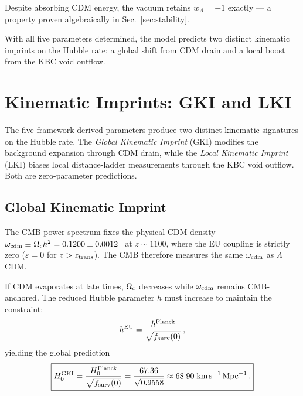 \documentclass[a4paper,fleqn]{cas-dc}
\newcommand{\eps}{\varepsilon}
\newcommand{\ztrans}{z_{\rm trans}}
\newcommand{\fsurv}{f_{\rm surv}}
\newcommand{\Ocdm}{\Omega_{\rm c}}
\begin{document}
Despite absorbing CDM energy, the vacuum retains $w_\Lambda = -1$
exactly --- a property proven algebraically in
Sec.~\ref{sec:stability}.

With all five parameters determined, the model predicts two distinct
kinematic imprints on the Hubble rate: a global shift from CDM drain
and a local boost from the KBC void outflow.

\section{Kinematic Imprints: GKI and LKI}
\label{sec:gki_lki}

The five framework-derived parameters produce two distinct kinematic
signatures on the Hubble rate. The \textit{Global Kinematic Imprint}
(GKI) modifies the background expansion through CDM drain, while the
\textit{Local Kinematic Imprint} (LKI) biases local distance-ladder
measurements through the KBC void outflow. Both are zero-parameter
predictions.

\subsection{Global Kinematic Imprint}
\label{sec:gki}

The CMB power spectrum fixes the physical CDM density
$\omega_{\rm cdm} \equiv \Ocdm h^2 = 0.1200 \pm 0.0012$~\cite{planck2018}
at $z \sim 1100$, where the EU coupling is strictly zero
($\eps = 0$ for $z > \ztrans$). The CMB therefore measures the same
$\omega_{\rm cdm}$ as $\Lambda$CDM.

If CDM evaporates at late times, $\Ocdm$ decreases while
$\omega_{\rm cdm}$ remains CMB-anchored. The reduced Hubble parameter
$h$ must increase to maintain the constraint:
\begin{equation}
h^{\rm EU} = \frac{h^{\rm Planck}}{\sqrt{\fsurv(0)}}\,,
\label{eq:h_gki}
\end{equation}
yielding the global prediction
\begin{equation}
\boxed{H_0^{\rm GKI}
  = \frac{H_0^{\rm Planck}}{\sqrt{\fsurv(0)}}
  = \frac{67.36}{\sqrt{0.9558}}
  \approx 68.90 \;\text{km}\,\text{s}^{-1}\,\text{Mpc}^{-1}\,.}
\label{eq:H0_gki}
\end{equation}
\end{document}

